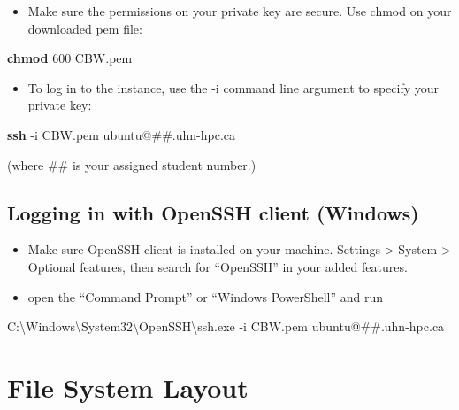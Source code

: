 \documentclass[
]{book}
\newenvironment{Shaded}{\begin{snugshade}}{\end{snugshade}}
\newcommand{\AttributeTok}[1]{\textcolor[rgb]{0.13,0.29,0.53}{#1}}
\newcommand{\ExtensionTok}[1]{#1}
\newcommand{\FunctionTok}[1]{\textcolor[rgb]{0.13,0.29,0.53}{\textbf{#1}}}
\newcommand{\NormalTok}[1]{#1}
\providecommand{\tightlist}{%
  \setlength{\itemsep}{0pt}\setlength{\parskip}{0pt}}
\begin{document}
\begin{itemize}
\tightlist
\item
  Make sure the permissions on your private key are secure. Use chmod on your downloaded pem file:
\end{itemize}

\begin{Shaded}
\begin{Highlighting}[]
 \FunctionTok{chmod}\NormalTok{ 600 CBW.pem}
\end{Highlighting}
\end{Shaded}

\begin{itemize}
\tightlist
\item
  To log in to the instance, use the -i command line argument to specify your private key:
\end{itemize}

\begin{Shaded}
\begin{Highlighting}[]
 \FunctionTok{ssh} \AttributeTok{{-}i}\NormalTok{ CBW.pem ubuntu@\#\#.uhn{-}hpc.ca}
\end{Highlighting}
\end{Shaded}

(where \#\# is your assigned student number.)

\subsection{Logging in with OpenSSH client (Windows)}\label{logging-in-with-openssh-client-windows}

\begin{itemize}
\item
  Make sure OpenSSH client is installed on your machine. Settings \textgreater{} System \textgreater{} Optional features, then search for ``OpenSSH'' in your added features.
\item
  open the ``Command Prompt'' or ``Windows PowerShell'' and run
\end{itemize}

\begin{Shaded}
\begin{Highlighting}[]
 \ExtensionTok{C:\textbackslash{}Windows\textbackslash{}System32\textbackslash{}OpenSSH\textbackslash{}ssh.exe} \AttributeTok{{-}i}\NormalTok{ CBW.pem ubuntu@\#\#.uhn{-}hpc.ca}
\end{Highlighting}
\end{Shaded}

\section{File System Layout}\label{file-system-layout}
\end{document}
